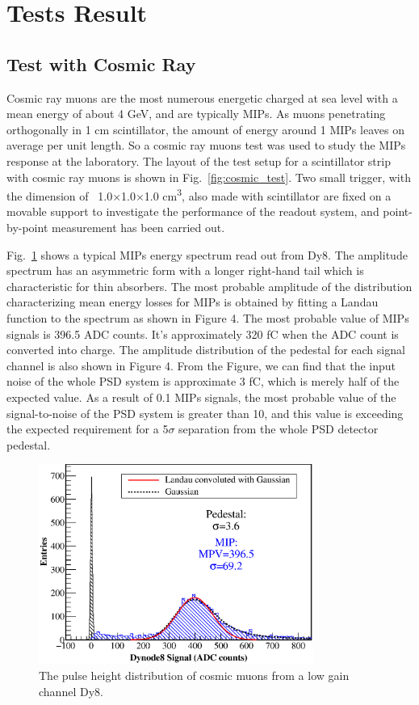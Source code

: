 \documentclass[5p, times]{elsarticle}
\begin{document}
\section{Tests Result}
\label{sec:result}

\subsection{Test with Cosmic Ray}
\label{sec:cosmicray}

Cosmic ray muons are the most numerous energetic charged at sea level with a mean energy of about 4 GeV, and are
typically MIPs. As muons penetrating orthogonally in 1 cm scintillator, the amount of energy around 1 MIPs leaves on
average per unit length. So a cosmic ray muons test was used to study the MIPs response at the laboratory. The layout
of the test setup for a scintillator strip with cosmic ray muons is shown in Fig.~\ref{fig:cosmic_test}. Two small trigger, with the
dimension of \ 1.0×1.0×1.0 cm\textsuperscript{3}, also made with scintillator are fixed on a movable support to
investigate the performance of the readout system, and point-by-point measurement has been carried out. 

Fig.~\ref{fig:mip} shows a typical MIPs energy spectrum read out from Dy8. The amplitude spectrum has an asymmetric form with a
longer right-hand tail which is characteristic for thin absorbers. The most probable amplitude of the distribution
characterizing mean energy losses for MIPs is obtained by fitting a Landau function to the spectrum as shown in Figure
4. The most probable value of MIPs signals is 396.5 ADC counts. It’s approximately 320 fC when the ADC count is
converted into charge. The amplitude distribution of the pedestal for each signal channel is also shown in Figure 4.
From the Figure, we can find that the input noise of the whole PSD system is approximate 3 fC, which is merely half of
the expected value. As a result of 0.1 MIPs signals, the most probable value of the signal-to-noise of the PSD system
is greater than 10, and this value is exceeding the expected requirement for a 5$\sigma $ separation from the whole PSD
detector pedestal.

\begin{figure}
 \centering
 \includegraphics[width=90mm]{mip}
\caption{The pulse height distribution of cosmic muons from a low gain channel Dy8.}
\label{fig:mip}
\end{figure} 
\end{document}
